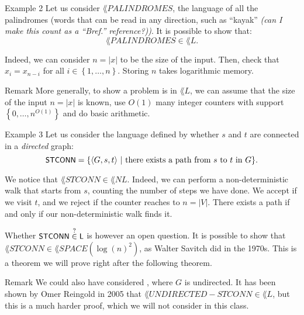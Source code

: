 \documentclass[a4paper]{article}
\begin{document}
\begin{parag}{Example 2}
    Let us consider $\lang{PALINDROMES}$, the language of all the palindromes (words that can be read in any direction, such as ``kayak'' \textit{(can I make this count as a ``Bref.'' reference?))}. It is possible to show that: 
    \[\lang{PALINDROMES} \in \lang{L}.\]
    
    Indeed, we can consider $n = \left|x\right|$ to be the size of the input. Then, check that $x_i = x_{n-i}$ for all $i \in \left\{1, \ldots, n\right\}$. Storing $n$ takes logarithmic memory.

    \begin{subparag}{Remark}
        More generally, to show a problem is in $\lang{L}$, we can assume that the size of the input $n = \left|x\right|$ is known, use $O\left(1\right)$ many integer counters with support $\left\{0, \ldots, n^{O\left(1\right)}\right\}$ and do basic arithmetic.
    \end{subparag}
\end{parag}

\begin{parag}{Example 3}
    Let us consider the language defined by whether $s$ and $t$ are connected in a \textit{directed} graph: 
    \[\lang{STCONN} = \left\{\left\langle G, s, t \right\rangle \suchthat \text{there exists a path from $s$ to $t$ in $G$}\right\}.\]

    We notice that $\lang{STCONN} \in \lang{NL}$. Indeed, we can perform a non-deterministic walk that starts from $s$, counting the number of steps we have done. We accept if we visit $t$, and we reject if the counter reaches to $n = \left|V\right|$. There exists a path if and only if our non-deterministic walk finds it.

    Whether $\lang{STCONN} \over{\in}{?} \lang{L}$ is however an open question. It is possible to show that $\lang{STCONN} \in \lang{SPACE}\left(\log\left(n\right)^2\right)$, as Walter Savitch did in the 1970s. This is a theorem we will prove right after the following theorem.

    \begin{subparag}{Remark}
        We could also have considered , where $G$ is undirected. It has been shown by Omer Reingold in 2005 that $\lang{UNDIRECTED-STCONN} \in \lang{L}$, but this is a much harder proof, which we will not consider in this class.
    \end{subparag}
\end{parag}
\end{document}
